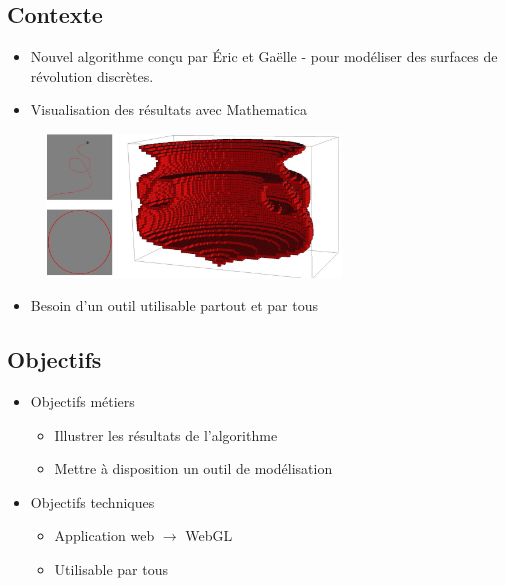 \documentclass[xcolor=dvipsnames]{beamer}
\begin{document}
	\subsection{Contexte}
	\begin{frame}{\subsecname}
		\begin{itemize}
			\item Nouvel algorithme conçu par \'Eric  et
				Ga\"elle - pour mod\'eliser
				des surfaces de r\'evolution discr\`etes.
			\item Visualisation des r\'esultats avec Mathematica
		\end{itemize}
		\begin{figure}
			\includegraphics[height=3.8cm]{../Images/revolution2.jpg}
		\end{figure}
		\begin{itemize}
			\item Besoin d'un outil utilisable partout et par tous
		\end{itemize}
	\end{frame}


	\subsection{Objectifs}
	\begin{frame}{\subsecname}
		\begin{itemize}
			\item Objectifs métiers
			\begin{itemize}
				\item Illustrer les r\'esultats de l'algorithme
				\item Mettre \`a disposition un outil de mod\'elisation
			\end{itemize}
		\end{itemize}
		\begin{itemize}
			\item Objectifs techniques
			\begin{itemize}
				\item Application web $\to$ WebGL
				\item Utilisable par tous
			\end{itemize}
		\end{itemize}
	\end{frame}
\end{document}
